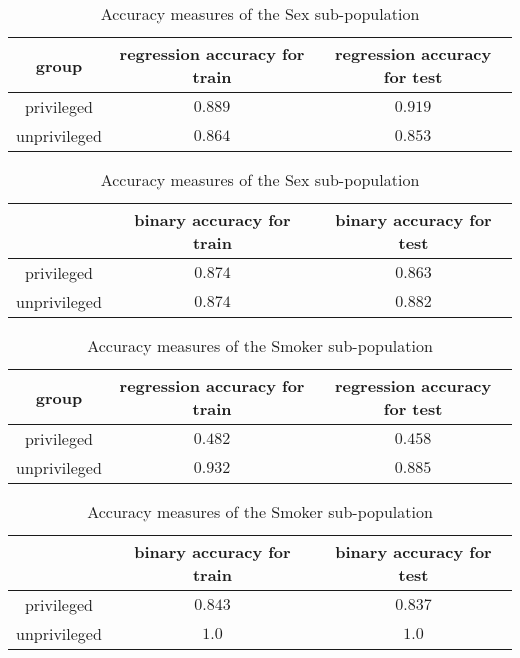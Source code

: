 \documentclass[10pt]{article}
\begin{document}
\begin{table}[h!]
    \centering
    \begin{tabular}{c|c|c}
         group & regression accuracy for train& regression accuracy for test\\
         \hline
         \hline
         privileged & \(0.889\) & \(0.919\)\\
         \hline
         unprivileged & \(0.864\) & \(0.853\)
    \end{tabular}
    \vspace{3pt}
    \begin{tabular}{c|c|c}
          & \hphantom{re}binary accuracy for train\hphantom{re}& \hphantom{re}binary accuracy for test\hphantom{re}\\
         \hline
         \hline
         privileged & \(0.874\) & \(0.863\)\\
         \hline
         unprivileged & \(0.874\) & \(0.882\)
    \end{tabular}
    \vspace{3pt}
    \caption{Accuracy measures of the Sex sub-population}
    \label{tab:acc_sex}
\end{table}

\begin{table}[h!]
    \centering
    \begin{tabular}{c|c|c}
         group & regression accuracy for train& regression accuracy for test\\
         \hline
         \hline
         privileged & \(0.482\) & \(0.458\)\\
         \hline
         unprivileged & \(0.932\) & \(0.885\)
    \end{tabular}
    \vspace{3pt}
    \begin{tabular}{c|c|c}
          & \hphantom{re}binary accuracy for train\hphantom{re}& \hphantom{re}binary accuracy for test\hphantom{re}\\
         \hline
         \hline
         privileged & \(0.843\) & \(0.837\)\\
         \hline
         unprivileged & \(1.0\) & \(1.0\)
    \end{tabular}
    \vspace{3pt}
    \caption{Accuracy measures of the Smoker sub-population}
    \label{tab:acc_smoker}
\end{table}
\end{document}
